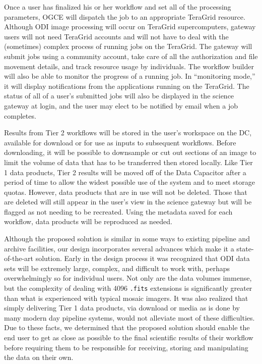 \documentclass[10pt,conference]{IEEEtran}
\begin{document}
Once a user has finalized his or her workflow and set all of the processing parameters, OGCE will dispatch the job to an appropriate TeraGrid resource. Although ODI image processing will occur on TeraGrid supercomputers, gateway users will not need TeraGrid accounts and will not have to deal with the (sometimes) complex process of running jobs on the TeraGrid. The gateway will submit jobs using a community account, take care of all the authorization and file movement details, and track resource usage by individuals. The workflow builder will also be able to monitor the progress of a running job. In ``monitoring mode,'' it will display notifications from the applications running on the TeraGrid. The status of all of a user's submitted jobs will also be displayed in the science gateway at login, and the user may elect to be notified by email when a job completes. 
 
Results from Tier 2 workflows will be stored in the user's workspace on the DC, available for download or for use as inputs to subsequent workflows. Before downloading, it will be possible to downsample or cut out sections of an image to limit the volume of data that has to be transferred then stored locally. Like Tier 1 data products, Tier 2 results will be moved off of the Data Capacitor after a period of time to allow the widest possible use of the system and to meet storage quotas. However, data products that are in use will not be deleted. Those that are deleted will still appear in the user's view in the science gateway but will be flagged as not needing to be recreated. Using the metadata saved for each workflow, data products will be reproduced as needed.

Although the proposed solution is similar in some ways to existing pipeline and archive facilities, our design incorporates several advances which make it a state-of-the-art solution. Early in the design process it was recognized that ODI data sets will be extremely large, complex, and difficult to work with, perhaps overwhelmingly so for individual users. Not only are the data volumes immense, but the complexity of dealing with 4096 {\tt .fits} extensions is significantly greater than what is experienced with typical mosaic imagers. It was also realized that simply delivering Tier 1 data products, via download or media as is done by many modern day pipeline systems, would not alleviate most of these difficulties. Due to these facts, we determined that the proposed solution should enable the end user to get as close as possible to the final scientific results of their workflow before requiring them to be responsible for receiving, storing and manipulating the data on their own. 
\end{document}

